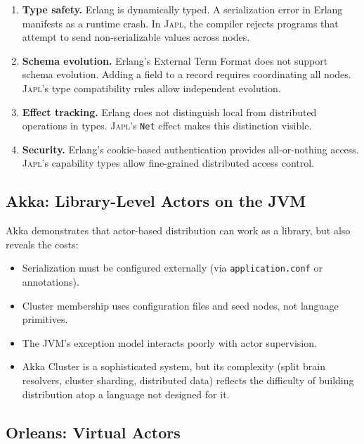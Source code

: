 \documentclass[11pt,a4paper]{article}
\newcommand{\japl}{\textsc{Japl}}
\begin{document}
\begin{enumerate}[nosep]
  \item \textbf{Type safety.} Erlang is dynamically typed. A serialization
        error in Erlang manifests as a runtime crash. In \japl{}, the
        compiler rejects programs that attempt to send non-serializable
        values across nodes.
  \item \textbf{Schema evolution.} Erlang's External Term Format does not
        support schema evolution. Adding a field to a record requires
        coordinating all nodes. \japl{}'s type compatibility rules allow
        independent evolution.
  \item \textbf{Effect tracking.} Erlang does not distinguish local from
        distributed operations in types. \japl{}'s \texttt{Net} effect
        makes this distinction visible.
  \item \textbf{Security.} Erlang's cookie-based authentication provides
        all-or-nothing access. \japl{}'s capability types allow
        fine-grained distributed access control.
\end{enumerate}

\subsection{Akka: Library-Level Actors on the JVM}

Akka demonstrates that actor-based distribution can work as a library, but
also reveals the costs:

\begin{itemize}[nosep]
  \item Serialization must be configured externally (via
        \texttt{application.conf} or annotations).
  \item Cluster membership uses configuration files and seed nodes, not
        language primitives.
  \item The JVM's exception model interacts poorly with actor supervision.
  \item Akka Cluster is a sophisticated system, but its complexity (split
        brain resolvers, cluster sharding, distributed data) reflects the
        difficulty of building distribution atop a language not designed
        for it.
\end{itemize}

\subsection{Orleans: Virtual Actors}
\end{document}
